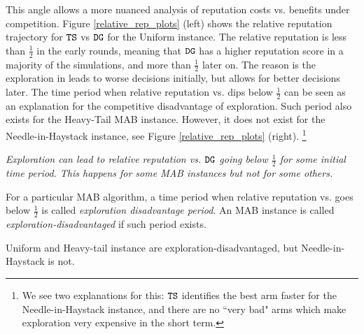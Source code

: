 \documentclass[../competing_bandits.tex]{subfiles}
\begin{document}
This angle allows a more nuanced analysis of reputation costs vs. benefits under competition. Figure \ref{relative_rep_plots} (left) shows the relative reputation trajectory for $\mathtt{TS}$ vs $\mathtt{DG}$ for the Uniform instance. The relative reputation is less than $\tfrac12$ in the early rounds, meaning that $\mathtt{DG}$ has a higher reputation score in a majority of the simulations, and more than $\tfrac12$ later on. The reason is the exploration in \TS leads to worse decisions initially, but allows for better decisions later. The time period when relative reputation vs. \DG dips below $\tfrac12$ can be seen as an explanation for the competitive disadvantage of exploration. Such period also exists for the Heavy-Tail MAB instance. However, it does not exist for the Needle-in-Haystack instance, see Figure \ref{relative_rep_plots} (right).%
\footnote{We see two explanations for this: $\mathtt{TS}$ identifies the best arm faster for the Needle-in-Haystack instance, and there are no ``very bad" arms which make exploration very expensive in the short term.}


\begin{finding}\label{find:period}
\textit{Exploration can lead to relative reputation vs. $\mathtt{DG}$ going below $\tfrac12$ for some initial time period. This happens for some MAB instances but not for some others.}
\end{finding}

\begin{definition}
For a particular MAB algorithm, a time period when relative reputation vs. \DG goes below $\tfrac12$ is called {\em exploration disadvantage period}. An MAB instance is called \emph{exploration-disadvantaged} if such period exists.
\end{definition}

\noindent Uniform and Heavy-tail instance are exploration-disadvantaged, but Needle-in-Haystack is not.
\end{document}
